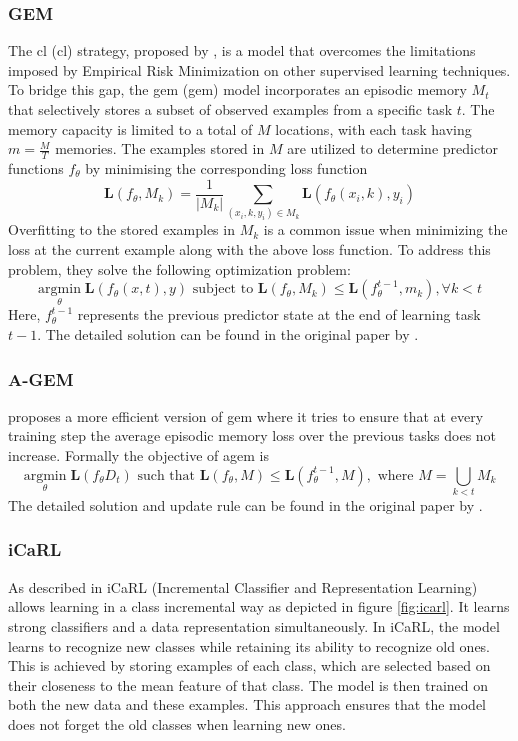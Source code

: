 \subsubsection{GEM}
\label{sec:gem}
The \acrlong{cl} (\acrshort{cl}) strategy, proposed by \citep{lopez2017gradient}, is a model that overcomes the limitations imposed by Empirical Risk Minimization \citep{vapnik1991principles} on other supervised learning techniques. To bridge this gap, the \acrlong{gem} (\acrshort{gem}) model incorporates an episodic memory $M_t$ that selectively stores a subset of observed examples from a specific task $t$. The memory capacity is limited to a total of $M$ locations, with each task having $m=\frac{M}{T}$ memories. The examples stored in $M$ are utilized to determine predictor functions $f_{\theta}$ by minimising the corresponding loss function
\[
\mathbf{L}(f_{\theta}, M_{k}) = \frac{1}{|M_{k}|} \sum_{(x_i, k, y_i) \in M_{k}} \mathbf{L}(f_{\theta}(x_i , k), y_i)
\]
Overfitting to the stored examples in $M_{k}$ is a common issue when minimizing the loss at the current example along with the above loss function. To address this problem, they solve the following optimization problem:
\[ 
\underset{\theta}{\mathrm{argmin }} \; \mathbf{L}(f_{\theta}(x,t),y) \text{ subject to } \mathbf{L}(f_{\theta}, M_{k}) \leq \mathbf{L}(f_{\theta}^{t-1}, m_k), \forall k<t 
\]
Here, $f^{t-1}_{\theta}$ represents the previous predictor state at the end of learning task $t-1$. The detailed solution can be found in the original paper by \citep{lopez2017gradient}.


\subsubsection{A-GEM}
\label{sec:a-gem}
\citep{chaudhry2018efficient} proposes a more efficient version of \acrshort{gem} where it tries to ensure that at every training step the average episodic memory loss over the previous tasks does not increase. Formally the objective of \acrshort{agem} is
\[ 
\underset{\theta}{\mathrm{argmin }} \; \mathbf{L}(f_{\theta} D_{t}) \text{ such that } \mathbf{L}(f_{\theta}, M) \leq \mathbf{L}(f_{\theta}^{t-1}, M), \text{ where } M = \underset{k<t}{\bigcup} M_{k} 
\]
The detailed solution and update rule can be found in the original paper by \citep{chaudhry2018efficient}.

\subsubsection{iCaRL}
As described in \citep{rebuffi2017icarl} iCaRL (Incremental Classifier and Representation Learning) allows learning in a class incremental way as depicted in figure \ref{fig:icarl}. It learns strong classifiers and a data representation simultaneously. In iCaRL, the model learns to recognize new classes while retaining its ability to recognize old ones. This is achieved by storing examples of each class, which are selected based on their closeness to the mean feature of that class. 
The model is then trained on both the new data and these examples. This approach ensures that the model does not forget the old classes when learning new ones. 

